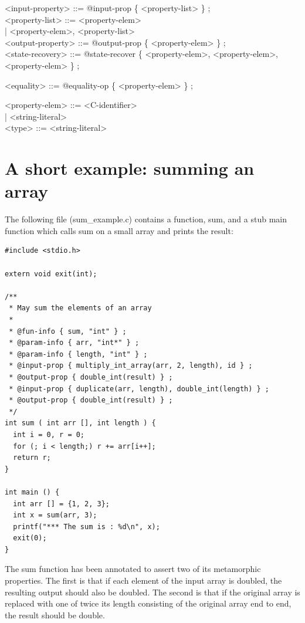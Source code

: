 \documentclass[notitlepage]{article}
\begin{document}
<input-property> ::= @input-prop \{ <property-list> \} ; \\

<property-list> ::= <property-elem> \\
\phantom{1}\hspace{85pt}| <property-elem>, <property-list> \\

<output-property> ::= @output-prop \{ <property-elem> \} ; \\

<state-recovery> ::= @state-recover \{ <property-elem>, <property-elem>, <property-elem> \} ;

<equality> ::= @equality-op \{ <property-elem> \} ;

<property-elem> ::= <C-identifier> \\
\phantom{1}\hspace{85pt}| <string-literal> \\

<type> ::= <string-literal>


\rmfamily

\section{A short example: summing an array}

The following file (sum\_example.c) contains a function, sum, and a stub main function which calls sum on a small array and prints the result:

\begin{verbatim}
#include <stdio.h>

extern void exit(int);

/**
 * May sum the elements of an array
 *
 * @fun-info { sum, "int" } ;
 * @param-info { arr, "int*" } ;
 * @param-info { length, "int" } ;
 * @input-prop { multiply_int_array(arr, 2, length), id } ;
 * @output-prop { double_int(result) } ;
 * @input-prop { duplicate(arr, length), double_int(length) } ;
 * @output-prop { double_int(result) } ;
 */
int sum ( int arr [], int length ) {
  int i = 0, r = 0;
  for (; i < length;) r += arr[i++];
  return r;
}

int main () {
  int arr [] = {1, 2, 3};
  int x = sum(arr, 3);
  printf("*** The sum is : %d\n", x);
  exit(0);
}
\end{verbatim}

The sum function has been annotated to assert two of its metamorphic properties. The first is that if each element of the input array is doubled, the resulting output should also be doubled. The second is that if the original array is replaced with one of twice its length consisting of the original array end to end, the result should be double.
\end{document}
